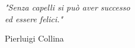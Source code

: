 \newlength\longest

\clearpage

\thispagestyle{empty}
\null\vfill

\settowidth{}
\begin{center}
    \parbox{\longest}{%
        \raggedright{\LARGE\itshape%
            "Senza capelli si può aver successo\\
            ed essere felici."\par\bigskip
        }
        \raggedleft\Large{Pierluigi Collina}\par%
    }
\end{center}


\vfill\vfill

\clearpage